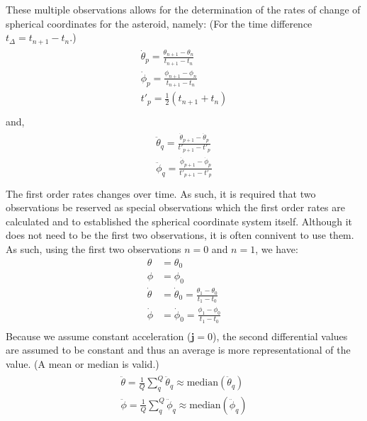 \documentclass[letterpaper,11pt,english]{sphinxmanual}
\begin{document}
\sphinxAtStartPar
These multiple observations allows for the determination of the rates of
change of spherical coordinates for the asteroid, namely: (For the time
difference \(t_\Delta = t_{n+1} - t_n\).)
\begin{align*}\!\begin{aligned}
\dot\theta_p = \frac{\theta_{n+1} - \theta_{n}}{t_{n+1} - t_n}\\
\dot\phi_p = \frac{\phi_{n+1} - \phi_{n}}{t_{n+1} - t_n}\\
t'_p = \frac{1}{2} \left( t_{n+1} + t_n \right)\\
\end{aligned}\end{align*}
\sphinxAtStartPar
and,
\begin{align*}\!\begin{aligned}
\ddot\theta_q = \frac{\dot\theta_{p+1} - \dot\theta_{p}}{t'_{p+1} - t'_p}\\
\ddot\phi_q = \frac{\dot\phi_{p+1} - \dot\phi_{p}}{t'_{p+1} - t'_p}\\
\end{aligned}\end{align*}
\sphinxAtStartPar
The first order rates changes over time. As such, it is required that two
observations be reserved as special observations which the first order rates
are calculated and to established the spherical coordinate system itself.
Although it does not need to be the first two observations, it is often
connivent to use them. As such, using the first two observations
\(n=0\) and \(n=1\), we have:
\begin{equation*}
\begin{split}\theta &= \theta_0 \\
\phi &= \phi_0 \\
\dot\theta &= \dot\theta_0 = \frac{\theta_1 - \theta_0}{t_1 - t_0} \\
\dot\phi &= \dot\phi_0 = \frac{\phi_1 - \phi_0}{t_1 - t_0} \\\end{split}
\end{equation*}
\sphinxAtStartPar
Because we assume constant acceleration (\(\mathbf{j} = 0\)), the second
differential values are assumed to be constant and thus an average is more
representational of the value. (A mean or median is valid.)
\begin{align*}\!\begin{aligned}
\ddot\theta = \frac{1}{Q} \sum_q^Q \ddot\theta_q \approx \mathrm{median} (\ddot\theta_q)\\
\ddot\phi = \frac{1}{Q} \sum_q^Q \ddot\phi_q \approx \mathrm{median} (\ddot\phi_q)\\
\end{aligned}\end{align*}
\end{document}
